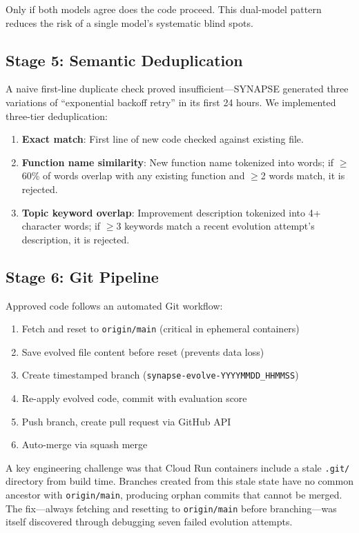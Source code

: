 \documentclass[11pt,a4paper]{article}
\begin{document}
Only if both models agree does the code proceed. This dual-model pattern reduces the risk of a single model's systematic blind spots.

\subsection{Stage 5: Semantic Deduplication}
\label{sec:dedup}

A naive first-line duplicate check proved insufficient---SYNAPSE generated three variations of ``exponential backoff retry'' in its first 24 hours. We implemented three-tier deduplication:

\begin{enumerate}[noitemsep]
    \item \textbf{Exact match}: First line of new code checked against existing file.
    \item \textbf{Function name similarity}: New function name tokenized into words; if $\geq$60\% of words overlap with any existing function and $\geq$2 words match, it is rejected.
    \item \textbf{Topic keyword overlap}: Improvement description tokenized into 4+ character words; if $\geq$3 keywords match a recent evolution attempt's description, it is rejected.
\end{enumerate}

\subsection{Stage 6: Git Pipeline}

Approved code follows an automated Git workflow:
\begin{enumerate}[noitemsep]
    \item Fetch and reset to \texttt{origin/main} (critical in ephemeral containers)
    \item Save evolved file content before reset (prevents data loss)
    \item Create timestamped branch (\texttt{synapse-evolve-YYYYMMDD\_HHMMSS})
    \item Re-apply evolved code, commit with evaluation score
    \item Push branch, create pull request via GitHub API
    \item Auto-merge via squash merge
\end{enumerate}

A key engineering challenge was that Cloud Run containers include a stale \texttt{.git/} directory from build time. Branches created from this stale state have no common ancestor with \texttt{origin/main}, producing orphan commits that cannot be merged. The fix---always fetching and resetting to \texttt{origin/main} before branching---was itself discovered through debugging seven failed evolution attempts.
\end{document}
